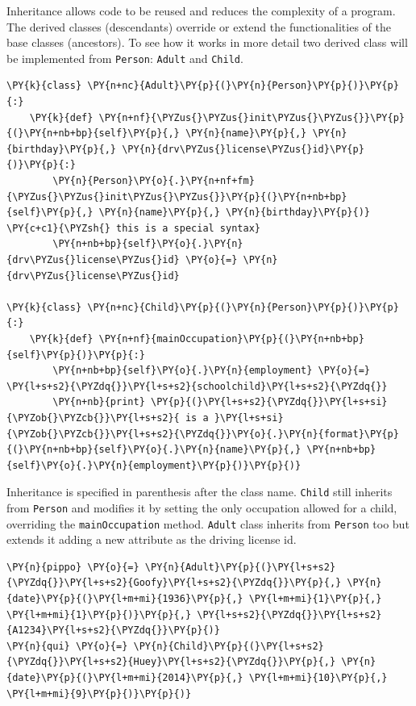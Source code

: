 Inheritance allows code to be reused and reduces the complexity of a
program. The derived classes (descendants) override or extend the
functionalities of the base classes (ancestors).
To see how it works in more detail two derived class will be implemented from \texttt{Person}: 
\texttt{Adult} and \texttt{Child}.

\begin{codebox}[breakable, size=fbox, boxrule=1pt, pad at break*=1mm,colback=cellbackground, colframe=cellborder]
\begin{Verbatim}[commandchars=\\\{\}]
\PY{k}{class} \PY{n+nc}{Adult}\PY{p}{(}\PY{n}{Person}\PY{p}{)}\PY{p}{:}
    \PY{k}{def} \PY{n+nf}{\PYZus{}\PYZus{}init\PYZus{}\PYZus{}}\PY{p}{(}\PY{n+nb+bp}{self}\PY{p}{,} \PY{n}{name}\PY{p}{,} \PY{n}{birthday}\PY{p}{,} \PY{n}{drv\PYZus{}license\PYZus{}id}\PY{p}{)}\PY{p}{:}
        \PY{n}{Person}\PY{o}{.}\PY{n+nf+fm}{\PYZus{}\PYZus{}init\PYZus{}\PYZus{}}\PY{p}{(}\PY{n+nb+bp}{self}\PY{p}{,} \PY{n}{name}\PY{p}{,} \PY{n}{birthday}\PY{p}{)} \PY{c+c1}{\PYZsh{} this is a special syntax}
        \PY{n+nb+bp}{self}\PY{o}{.}\PY{n}{drv\PYZus{}license\PYZus{}id} \PY{o}{=} \PY{n}{drv\PYZus{}license\PYZus{}id}

\PY{k}{class} \PY{n+nc}{Child}\PY{p}{(}\PY{n}{Person}\PY{p}{)}\PY{p}{:}
    \PY{k}{def} \PY{n+nf}{mainOccupation}\PY{p}{(}\PY{n+nb+bp}{self}\PY{p}{)}\PY{p}{:}
        \PY{n+nb+bp}{self}\PY{o}{.}\PY{n}{employment} \PY{o}{=} \PY{l+s+s2}{\PYZdq{}}\PY{l+s+s2}{schoolchild}\PY{l+s+s2}{\PYZdq{}}
        \PY{n+nb}{print} \PY{p}{(}\PY{l+s+s2}{\PYZdq{}}\PY{l+s+si}{\PYZob{}\PYZcb{}}\PY{l+s+s2}{ is a }\PY{l+s+si}{\PYZob{}\PYZcb{}}\PY{l+s+s2}{\PYZdq{}}\PY{o}{.}\PY{n}{format}\PY{p}{(}\PY{n+nb+bp}{self}\PY{o}{.}\PY{n}{name}\PY{p}{,} \PY{n+nb+bp}{self}\PY{o}{.}\PY{n}{employment}\PY{p}{)}\PY{p}{)}
\end{Verbatim}
\end{codebox}

Inheritance is specified in parenthesis after the class name.
\texttt{Child} still inherits from \texttt{Person} and modifies it by setting the only occupation 
allowed for a child, overriding the \texttt{mainOccupation} method.
\texttt{Adult} class inherits from \texttt{Person} too but extends it adding
a new attribute as the driving license id. 

\begin{codebox}[breakable, size=fbox, boxrule=1pt, pad at break*=1mm,colback=cellbackground, colframe=cellborder]
\begin{Verbatim}[commandchars=\\\{\}]
\PY{n}{pippo} \PY{o}{=} \PY{n}{Adult}\PY{p}{(}\PY{l+s+s2}{\PYZdq{}}\PY{l+s+s2}{Goofy}\PY{l+s+s2}{\PYZdq{}}\PY{p}{,} \PY{n}{date}\PY{p}{(}\PY{l+m+mi}{1936}\PY{p}{,} \PY{l+m+mi}{1}\PY{p}{,} \PY{l+m+mi}{1}\PY{p}{)}\PY{p}{,} \PY{l+s+s2}{\PYZdq{}}\PY{l+s+s2}{A1234}\PY{l+s+s2}{\PYZdq{}}\PY{p}{)}
\PY{n}{qui} \PY{o}{=} \PY{n}{Child}\PY{p}{(}\PY{l+s+s2}{\PYZdq{}}\PY{l+s+s2}{Huey}\PY{l+s+s2}{\PYZdq{}}\PY{p}{,} \PY{n}{date}\PY{p}{(}\PY{l+m+mi}{2014}\PY{p}{,} \PY{l+m+mi}{10}\PY{p}{,} \PY{l+m+mi}{9}\PY{p}{)}\PY{p}{)}
\end{Verbatim}
\end{codebox}

